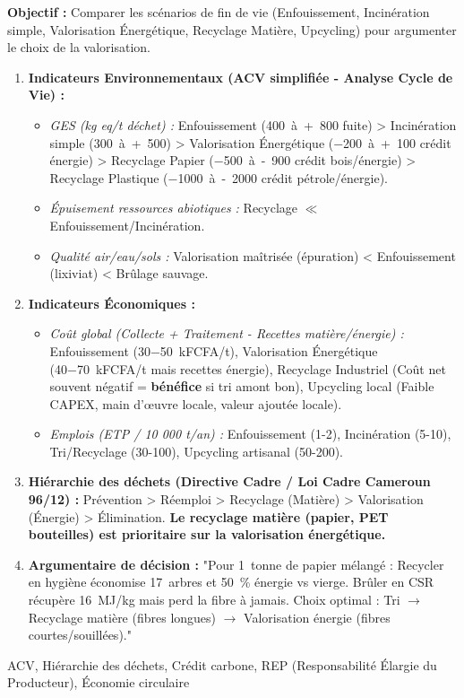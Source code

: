 \documentclass[11pt]{article}
\newcommand{\cle}[1]{{\popxbold\color{popdark}#1}}
\begin{document}
\begin{methode}
\textbf{Objectif :} Comparer les scénarios de fin de vie (Enfouissement, Incinération simple, Valorisation Énergétique, Recyclage Matière, Upcycling) pour argumenter le choix de la valorisation.
\begin{enumerate}
    \item \textbf{Indicateurs Environnementaux (ACV simplifiée - Analyse Cycle de Vie) :}
    \begin{itemize}
        \item \textit{GES (kg  eq/t déchet) :} Enfouissement (\SI{+400}{à +800}  fuite) > Incinération simple (\SI{+300}{à +500}) > Valorisation Énergétique (\SI{-200}{à +100} crédit énergie) > Recyclage Papier (\SI{-500}{à -900} crédit bois/énergie) > Recyclage Plastique (\SI{-1000}{à -2000} crédit pétrole/énergie).
        \item \textit{Épuisement ressources abiotiques :} Recyclage $\ll$ Enfouissement/Incinération.
        \item \textit{Qualité air/eau/sols :} Valorisation maîtrisée (épuration) < Enfouissement (lixiviat) < Brûlage sauvage.
    \end{itemize}
    \item \textbf{Indicateurs Économiques :}
    \begin{itemize}
        \item \textit{Coût global (Collecte + Traitement - Recettes matière/énergie) :} Enfouissement (\SI{30-50}{kFCFA/t}), Valorisation Énergétique (\SI{40-70}{kFCFA/t} mais recettes énergie), Recyclage Industriel (Coût net souvent négatif = \textbf{bénéfice} si tri amont bon), Upcycling local (Faible CAPEX, main d'œuvre locale, valeur ajoutée locale).
        \item \textit{Emplois (ETP / 10 000 t/an) :} Enfouissement (1-2), Incinération (5-10), Tri/Recyclage (30-100), Upcycling artisanal (50-200).
    \end{itemize}
    \item \textbf{Hiérarchie des déchets (Directive Cadre / Loi Cadre Cameroun 96/12) :} Prévention > Réemploi > Recyclage (Matière) > Valorisation (Énergie) > Élimination. \textbf{Le recyclage matière (papier, PET bouteilles) est prioritaire sur la valorisation énergétique.}
    \item \textbf{Argumentaire de décision :} "Pour \SI{1}{tonne} de papier mélangé : Recycler en hygiène économise \SI{17}{arbres} et \SI{50}{\%} énergie vs vierge. Brûler en CSR récupère \SI{16}{MJ/kg} mais perd la fibre à jamais. Choix optimal : Tri $\rightarrow$ Recyclage matière (fibres longues) $\rightarrow$ Valorisation énergie (fibres courtes/souillées)."
\end{enumerate}
\cle{ACV}, \cle{Hiérarchie des déchets}, \cle{Crédit carbone}, \cle{REP (Responsabilité Élargie du Producteur)}, \cle{Économie circulaire}
\end{methode}
\end{document}
